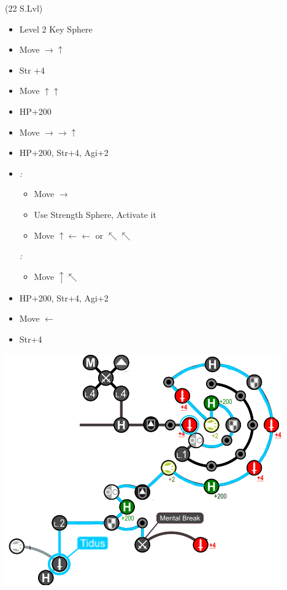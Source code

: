 \begin{spheregrid}
  \begin{itemize}
    \tidusf (22 S.Lvl)
    \begin{itemize}
      \item Level 2 Key Sphere
      \item Move $\rightarrow\uparrow$
      \item Str +4
      \item Move $\uparrow\uparrow$
      \item HP+200
      \item Move $\rightarrow\rightarrow\uparrow$
      \item HP+200, Str+4, Agi+2
      \item \textit{\blitzwin:}
      \begin{itemize}
      \item Move $\rightarrow$
      \item Use Strength Sphere, Activate it
      \item Move $\uparrow\leftarrow\leftarrow$ or $\nwarrow\nwarrow$
      \end{itemize}
      \textit{\blitzloss:}
      \begin{itemize}
      \item Move $\uparrow\nwarrow$
      \end{itemize}
      \item HP+200, Str+4, Agi+2
      \item Move $\leftarrow$
      \item Str+4
    \end{itemize}
    \includegraphics[width=.8\columnwidth]{graphics/Tidus_post_crawler}
  \end{itemize}
\end{spheregrid}
